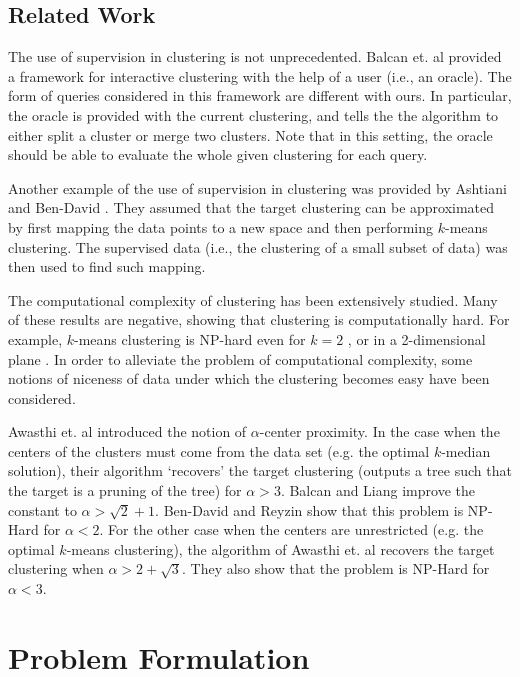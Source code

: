 \documentclass[orivec]{llncs}
\begin{document}
\subsection{Related Work}

The use of supervision in clustering is not unprecedented. Balcan et. al \cite{balcan2008clustering} provided a framework for interactive clustering with the help of a user (i.e., an oracle). The form of queries considered in this framework are different with ours. In particular, the oracle is provided with the current clustering, and tells the the algorithm to either split a cluster or merge two clusters. Note that in this setting, the oracle should be able to evaluate the whole given clustering for each query.

Another example of the use of supervision in clustering was provided by Ashtiani and Ben-David \cite{ashtiani2015representation}. They assumed that the target clustering can be approximated by first mapping the data points to a new space and then performing $k$-means clustering. The supervised data (i.e., the clustering of a small subset of data) was then used to find such mapping.

The computational complexity of clustering has been extensively studied. Many of these results are negative, showing that clustering is computationally hard. For example, $k$-means clustering is NP-hard even for $k=2$ \cite{dasgupta2008hardness}, or in a 2-dimensional plane \cite{vattani2009hardness,mahajan2009planar}. In order to alleviate the problem of computational complexity, some notions of niceness of data under which the clustering becomes easy have been considered.  

Awasthi et. al \cite{awasthi2012center} introduced the notion of $\alpha$-center proximity. In the case when the centers of the clusters must come from the data set (e.g. the optimal $k$-median solution), their algorithm `recovers' the target clustering (outputs a tree such that the target is a pruning of the tree) for $\alpha > 3$.  Balcan and Liang \cite{balcan2012clustering} improve the constant to $\alpha > \sqrt{2} + 1$. Ben-David and Reyzin \cite{ben2014data} show that this problem is NP-Hard for $\alpha < 2$. For the other case when the centers are unrestricted (e.g. the optimal $k$-means clustering), the algorithm of Awasthi et. al \cite{awasthi2012center} recovers the target clustering when $\alpha > 2+\sqrt{3}$. They also show that the problem is NP-Hard for $\alpha < 3$.

\section{Problem Formulation}
\end{document}
